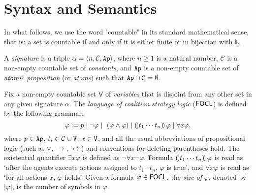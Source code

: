 \documentclass[sigconf,anonymous]{aamas}
\begin{document}
\section{Syntax and Semantics}

In what follows, we use the word "countable" in its standard mathematical sense, that is: a set is countable if and only if it is either finite or in bijection with $\mathbb{N}$.


\label{sec:csl}
\begin{definition} 

A \emph{signature} is a triple $\alpha= \langle n,\mathcal{C},\texttt{Ap} \rangle$, where $n\geq 1$ is a natural number,  $\mathcal{C}$ is a non-empty  countable set of \emph{constants}, and $\texttt{Ap}$ is a non-empty countable set of \emph{atomic proposition} (or \emph{atoms}) %
such that $\texttt{Ap} \cap \mathcal{C} = \emptyset$.


Fix %
a non-empty countable set  $\mathsf{V}$   %
of \emph{variables} that is disjoint from any other set in any given signature $\alpha$. 
The \emph{language of coalition strategy logic} ($\mathsf{FOCL}$) is defined by the following grammar:
    $$\varphi := p \mid \neg \varphi \mid \ (\varphi \land \varphi) \mid \assign{t_1\cdots t_n} \varphi  \mid \forall x \varphi,  $$
where $p \in \texttt{Ap}$, $t_i \in \mathcal{C}\cup\texttt{V}$, $x \in \texttt{V}$, and all the usual abbreviations of propositional logic (such as $\vee$, $\to$, $\leftrightarrow$) and conventions for deleting parentheses hold. The existential quantifier $\exists x \varphi$ is defined as %
$\lnot \forall x \lnot \varphi$.
Formula $(\!( t_1\cdots t_n )\!)\, \varphi$ is read as `after the agents execute actions assigned to $t_1\cdots t_n$, $\varphi$ is true', and $\forall x \varphi$ is read as `for all actions $x$, $\varphi$ holds'. Given a formula $\varphi \in \mathsf{FOCL}$, the \emph{size of} $\varphi$, denoted by $|\varphi|$, is the number of symbols in $\varphi$. 

\end{definition}



\end{document}
